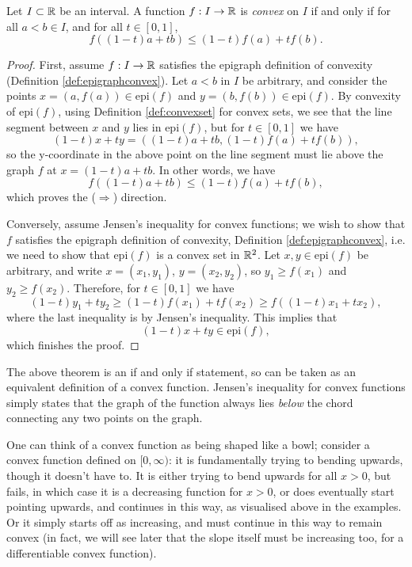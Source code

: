 \documentclass[../analysis1.tex]{subfiles}
\begin{document}
\begin{theorem}
\label{thm:jensen}
    \begin{shaded*}
        Let $I \subset \mathbb{R}$ be an interval. A function $f: I \to \mathbb{R}$ is \textit{convex} on $I$ if and only if for all $a< b \in I$, and for all $t \in [0,1]$,
        \[ f((1-t)a + tb) \le (1-t)f(a) + tf(b). \]
    \end{shaded*}
\end{theorem}
\begin{proof}
    First, assume $f:I\to\mathbb{R}$ satisfies the epigraph definition of convexity (Definition \ref{def:epigraphconvex}). Let $a<b$ in $I$ be arbitrary, and consider the points $x=(a,f(a))\in \mathrm{epi}(f)$ and $y=(b,f(b))\in \mathrm{epi}(f)$. By convexity of $\mathrm{epi}(f)$, using Definition \ref{def:convexset} for convex sets, we see that the line segment between $x$ and $y$ lies in $\mathrm{epi}(f)$, but for $t\in[0,1]$ we have
    \[(1-t)x+ty=((1-t)a+tb, (1-t)f(a)+tf(b)),\]
    so the y-coordinate in the above point on the line segment must lie above the graph $f$ at $x=(1-t)a+tb$. In other words, we have
    \[f((1-t)a+tb)\le (1-t)f(a)+tf(b),\]
    which proves the ($\Rightarrow$) direction.

    Conversely, assume Jensen's inequality for convex functions; we wish to show that $f$ satisfies the epigraph definition of convexity, Definition \ref{def:epigraphconvex}, i.e. we need to show that $\mathrm{epi}(f)$ is a convex set in $\mathbb{R}^2$. Let $x,y\in \mathrm{epi}(f)$ be arbitrary, and write $x=(x_1,y_1)$, $y=(x_2,y_2)$, so $y_1\ge f(x_1)$ and $y_2\ge f(x_2)$. Therefore, for $t\in[0,1]$ we have
    \[(1-t)y_1+ty_2\ge (1-t)f(x_1)+tf(x_2)\ge f((1-t)x_1+tx_2),\]
    where the last inequality is by Jensen's inequality. This implies that
    \[(1-t)x+ty\in\mathrm{epi}(f),\]
    which finishes the proof.\qedhere
\end{proof}

The above theorem is an if and only if statement, so can be taken as an equivalent definition of a convex function. Jensen's inequality for convex functions simply states that the graph of the function always lies \textit{below} the chord connecting any two points on the graph.  



\begin{remark}
    One can think of a convex function as being shaped like a bowl; consider a convex function defined on $[0,\infty)$: it is fundamentally trying to bending upwards, though it doesn't have to. It is either trying to bend upwards for all $x>0$, but fails, in which case it is a decreasing function for $x>0$, or does eventually start pointing upwards, and continues in this way, as visualised above in the examples. Or it simply starts off as increasing, and must continue in this way to remain convex (in fact, we will see later that the slope itself must be increasing too, for a differentiable convex function).
\end{remark}
\end{document}
